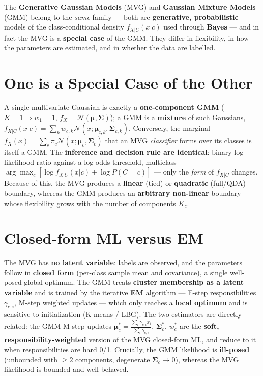 The \textbf{Generative Gaussian Models} (MVG) and \textbf{Gaussian Mixture Models} (GMM) belong to the \emph{same} family — both are \textbf{generative, probabilistic} models of the class-conditional density $f_{X|C}(x|c)$ used through \textbf{Bayes} — and in fact the MVG is a \textbf{special case} of the GMM. They differ in flexibility, in how the parameters are estimated, and in whether the data are labelled.

\section*{One is a Special Case of the Other}

A single multivariate Gaussian is exactly a \textbf{one-component GMM} ($K=1\Rightarrow w_1=1$, $f_X=\mathcal{N}(\boldsymbol{\mu},\boldsymbol{\Sigma})$); a GMM is a \textbf{mixture} of such Gaussians, $f_{X|C}(x|c)=\sum_k w_{c,k}\mathcal{N}(x;\boldsymbol{\mu}_{c,k},\boldsymbol{\Sigma}_{c,k})$. Conversely, the marginal $f_X(x)=\sum_c\pi_c\mathcal{N}(x;\boldsymbol{\mu}_c,\boldsymbol{\Sigma}_c)$ that an MVG \emph{classifier} forms over its classes is itself a GMM. The \textbf{inference and decision rule are identical}: binary log-likelihood ratio against a log-odds threshold, multiclass $\arg\max_c[\log f_{X|C}(x|c)+\log P(C=c)]$ — only the \emph{form} of $f_{X|C}$ changes. Because of this, the MVG produces a \textbf{linear} (tied) or \textbf{quadratic} (full/QDA) boundary, whereas the GMM produces an \textbf{arbitrary non-linear} boundary whose flexibility grows with the number of components $K_c$.

\section*{Closed-form ML versus EM}

The MVG has \textbf{no latent variable}: labels are observed, and the parameters follow in \textbf{closed form} (per-class sample mean and covariance), a single well-posed global optimum. The GMM treats \textbf{cluster membership as a latent variable} and is trained by the iterative \textbf{EM} algorithm — E-step responsibilities $\gamma_{c,i}$, M-step weighted updates — which only reaches a \textbf{local optimum} and is sensitive to initialization (K-means / LBG). The two estimators are directly related: the GMM M-step updates $\boldsymbol{\mu}_c^*=\tfrac{\sum_i\gamma_{c,i}x_i}{\sum_i\gamma_{c,i}}$, $\boldsymbol{\Sigma}_c^*$, $w_c^*$ are the \textbf{soft, responsibility-weighted} version of the MVG closed-form ML, and reduce to it when responsibilities are hard 0/1. Crucially, the GMM likelihood is \textbf{ill-posed} (unbounded with $\ge2$ components, degenerate $\boldsymbol{\Sigma}_c\to0$), whereas the MVG likelihood is bounded and well-behaved.

